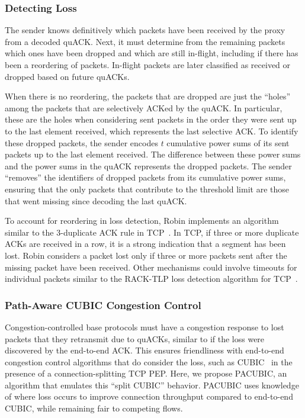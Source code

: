 \subsubsection{Detecting Loss}

The sender knows definitively which packets have been received by the proxy from
a decoded quACK. Next, it must determine from the remaining packets which ones
have been dropped and which are still in-flight, including if there has been a
reordering of packets. In-flight packets are later
classified as received or dropped based on future quACKs.

When there is no reordering, the packets that are dropped are just the ``holes''
among the packets that are selectively ACKed by the quACK. In particular, these
are the holes when considering sent packets in the order they were sent up to
the last element received, which represents the last selective ACK.
To identify these dropped packets, the sender encodes $t$ cumulative power sums
of its sent packets up to the last element received.
The difference between these power sums and the power
sums in the quACK represents the dropped packets. The sender ``removes'' the
identifiers of dropped packets from its cumulative power sums, ensuring that
the only packets that contribute to the threshold limit are those that
went missing since decoding the last quACK.

To account for reordering in loss detection, Robin implements an algorithm
similar to the 3-duplicate ACK rule in TCP~\cite{rfc5681tcp,rfc2001tcp}.
In TCP, if three or more duplicate ACKs are received in a row, it is a strong
indication that a segment has been lost. Robin considers a packet lost only if
three or more packets sent after the missing packet have been received.
Other mechanisms could involve timeouts for individual packets similar to the
RACK-TLP loss detection algorithm for TCP~\cite{rfc8985}.

\subsubsection{Path-Aware CUBIC Congestion Control}

Congestion-controlled base protocols must have a congestion response to lost
packets that they retransmit due to quACKs, similar to if the loss were
discovered by the end-to-end ACK.
This ensures friendliness with end-to-end congestion control algorithms that do
consider the loss, such as CUBIC~\cite{ha2008cubic} in the presence of a
connection-splitting TCP PEP.
Here, we propose PACUBIC, an algorithm that emulates this ``split CUBIC''
behavior. PACUBIC uses knowledge of where loss occurs to improve connection
throughput compared to end-to-end CUBIC, while remaining fair to competing flows.

